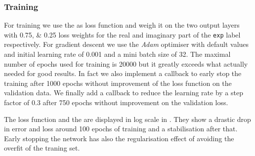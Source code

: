 \subsubsection{Training}

For training we use the \mse as loss function and weigh it on the two output layers with \numlist{0.75;0.25} loss weights for the real and imaginary part of the \texttt{exp} label respectively.\footnotemark{}
For gradient descent we use the \emph{Adam} optimiser with default values and initial learning rate of \num{0.001} and a mini batch size of 32.
The maximal number of epochs used for training is \num{20000} but it greatly exceeds what actually needed for good results.
In fact we also implement a callback to early stop the training after 1000 epochs without improvement of the loss function on the validation data.
We finally add a callback to reduce the learning rate by a step factor of \num{0.3} after 750 epochs without improvement on the validation loss.

The loss function and the \mse are displayed in log scale in .
They show a drastic drop in error and loss around 100 epochs of training and a stabilisation after that.
Early stopping the network has also the regularisation effect of avoiding the overfit of the traning set.


